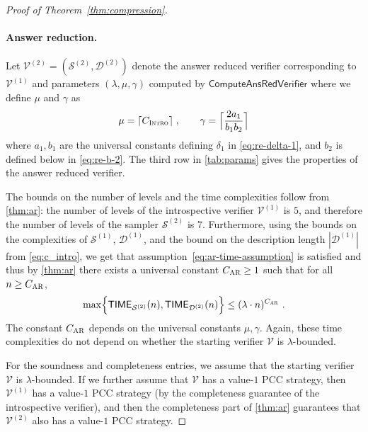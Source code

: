 \documentclass[11pt]{article}
\theoremstyle{definition}
\newcommand{\sampler}{\mathcal{S}}
\newcommand{\decider}{\mathcal{D}}
\newcommand{\verifier}{\mathcal{V}}
\newcommand{\gamestyle}[1]{\ensuremath{\textsc{#1}}\xspace}
\newcommand{\ar}{\gamestyle{AR}}
\newcommand{\intro}{\gamestyle{Intro}}
\newcommand{\TIME}{\mathsf{TIME}}
\newcommand{\tmstyle}[1]{\ensuremath{\mathsf{#1}}}
\newcommand{\ComputeAnsVerifier}{\tmstyle{ComputeAnsRedVerifier}}
\begin{document}
\begin{proof}[Proof of Theorem~\ref{thm:compression}]
  










  \paragraph{Answer reduction.} 
  Let $\verifier^{(2)} = (\sampler^{(2)}, \decider^{(2)})$ denote the answer
  reduced verifier corresponding to $\verifier^{(1)}$ and parameters $(\lambda,
\mu, \gamma)$ computed by $\ComputeAnsVerifier$ where we define $\mu$ and $\gamma$ as
  \begin{equation}
  \label{eq:mu-gamma}
  	\mu = \lceil C_\intro \rceil \;, \qquad \gamma = \Bigl\lceil \frac{2 a_1}{b_1 b_2} \Bigr\rceil
\end{equation}
where $a_1,b_1$ are the universal constants defining $\delta_1$ in \cref{eq:re-delta-1}, and $b_2$ is defined below in \cref{eq:re-b-2}. 
The third row in \cref{tab:params} gives the properties of
  the answer reduced verifier.


  The bounds on the number of levels and the time complexities follow
  from \cref{thm:ar}: the number of levels of the introspective verifier $\verifier^{(1)}$ is $5$, and therefore the number of levels of the sampler $\sampler^{(2)}$ is $7$. Furthermore, using the bounds on the complexities of $\sampler^{(1)}$, $\decider^{(1)}$, and the bound on the description length $|\decider^{(1)}|$ from \cref{eq:c_intro}, we get that assumption~\eqref{eq:ar-time-assumption} is satisfied and thus by \cref{thm:ar}
  there exists a universal
  constant $C_{\ar} \geq 1$ such that for all $n \geq C_{\ar}$,
\begin{equation}
    \label{eq:c_ar}
      \max \Bigl\{  \TIME_{\sampler^{(2)}}(n),  \TIME_{\decider^{(2)}}(n)
      \Bigr\} \le (\lambda \cdot n)^{C_\ar}~.
  \end{equation}
  The constant $C_\ar$ depends on the universal constants $\mu,\gamma$. Again, these time complexities do not depend on whether the starting verifier $\verifier$ is $\lambda$-bounded.

  For the soundness and completeness entries, we assume that the starting verifier $\verifier$ is $\lambda$-bounded. If we further assume that $\verifier$ has a value-$1$ PCC strategy, then $\verifier^{(1)}$ has a value-$1$ PCC strategy (by the completeness guarantee of the introspective verifier), and then the completeness part of \cref{thm:ar} guarantees that $\verifier^{(2)}$ also has a value-$1$ PCC strategy.
  

\end{proof}
\end{document}
